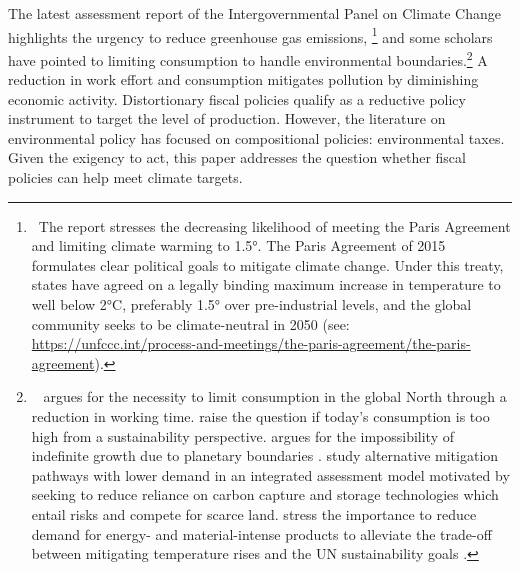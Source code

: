 The latest assessment report of the Intergovernmental Panel on Climate Change \citep{IPCC2022} highlights the urgency to reduce greenhouse gas emissions,%
\footnote{ \  The report stresses the decreasing likelihood of meeting the Paris Agreement and limiting climate warming to 1.5°. The Paris Agreement of 2015 formulates clear political goals to mitigate climate change. Under this treaty, states have agreed on a legally binding maximum increase in temperature to well below 2°C, preferably 1.5° over pre-industrial levels, and the global community seeks to be climate-neutral in 2050  (see: \url{https://unfccc.int/process-and-meetings/the-paris-agreement/the-paris-agreement}). 
}
and some scholars have pointed to limiting consumption to handle environmental boundaries.\footnote{\ \cite{Schor2005SustainableReductionb} argues for the necessity to limit consumption in the global North through a reduction in working time. \cite{Arrow2004AreMuch} raise the question if today's consumption is too high from a sustainability perspective. \cite{Dasgupta2021}  argues for the impossibility of indefinite growth due to planetary boundaries  \citep{Rockstrom2009AHumanity}. %
	 \cite{VanVuuren2018AlternativeTechnologies} study alternative mitigation pathways with lower demand %
	 in an integrated assessment model motivated by seeking to reduce reliance on carbon capture and storage technologies which entail risks and compete for scarce land. \cite{Bertram2018TargetedScenarios} stress the importance to reduce demand for energy- and material-intense products to alleviate the trade-off between mitigating temperature rises  and the UN sustainability goals%
	. } A reduction in work effort and consumption mitigates pollution by diminishing economic activity. Distortionary fiscal policies qualify as a reductive policy instrument to target the level of production.
However, the literature on environmental policy has focused on compositional policies: environmental taxes. %
Given the exigency to act, this paper addresses the question whether fiscal policies can help meet climate targets. %


